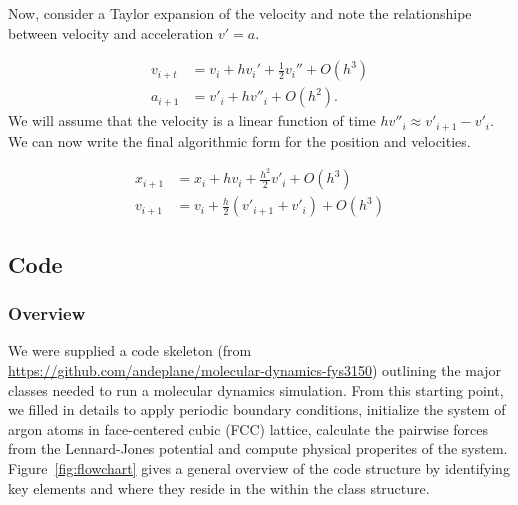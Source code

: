 \documentclass[10pt,showpacs,preprintnumbers,footinbib,amsmath,amssymb,aps,prl,twocolumn,groupedaddress,superscriptaddress,showkeys]{revtex4-1}
\begin{document}
Now, consider a Taylor expansion of the velocity and note the
relationshipe between velocity and acceleration $v' = a$.

\begin{align*}
	v_{i+t} &= v_i + h v_i ' + \frac{1}{2} v_i '' + O(h^3)\\
	a_{i+1} &= v'_i + h v''_i + O(h^2).
\end{align*}
We will assume that the velocity is a linear function of time
$hv''_i \approx v'_{i+1} - v'_i$. We can now write the final
algorithmic form for the position and velocities.

\begin{align}
	x_{i+1} &= x_i + hv_i + \frac{h^2}{2} v'_i + O(h^3)\\
	v_{i+1} &= v_i + \frac{h}{2}(v'_{i+1} + v'_i) + O(h^3)
\label{eq:Verlet}
\end{align}

\subsection*{Code}

\subsubsection*{Overview}

We were supplied a code skeleton (from
\url{ https://github.com/andeplane/molecular-dynamics-fys3150})
 outlining the major classes needed to run a molecular dynamics
simulation. From this starting point, we filled in details to apply
periodic boundary conditions, initialize the system of argon
atoms in face-centered cubic (FCC) lattice, calculate the pairwise
forces from the Lennard-Jones potential and compute physical
properites of the system. Figure~\ref{fig:flowchart} gives a
general overview of the code structure by identifying key
elements and where they reside in the within the class structure.
\end{document}
